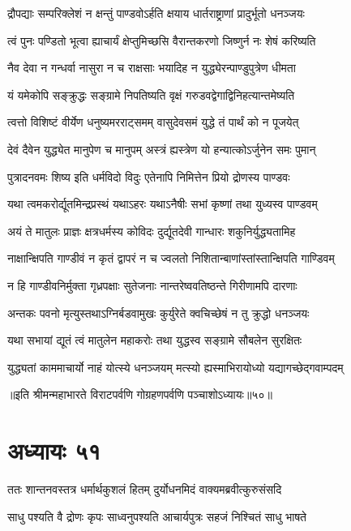 \twolineshloka
{द्रौपद्याः सम्परिक्लेशं न क्षन्तुं पाण्डवोऽर्हति}
{क्षयाय धार्तराष्ट्राणां प्रादुर्भूतो धनञ्जयः}


\twolineshloka
{त्वं पुनः पण्डितो भूत्वा ह्याचार्यं क्षेप्तुमिच्छसि}
{वैरान्तकरणो जिष्णुर्न नः शेषं करिष्यति}


\twolineshloka
{नैव देवा न गन्धर्वा नासुरा न च राक्षसाः}
{भयादिह न युद्ध्येरन्पाण्डुपुत्रेण धीमता}


\twolineshloka
{यं यमेकोपि सङ्क्रुद्धः सङ्ग्रामे निपतिष्यति}
{वृक्षं गरुडवद्वेगाद्विनिहत्यान्तमेष्यति}


\twolineshloka
{त्वत्तो विशिष्टं वीर्येण धनुष्यमरराट्समम्}
{वासुदेवसमं युद्धे तं पार्थं को न पूजयेत्}


\twolineshloka
{देवं दैवेन युद्ध्येत मानुपेण च मानुपम्}
{अस्त्रं ह्यस्त्रेण यो हन्यात्कोऽर्जुनेन समः पुमान्}


\twolineshloka
{पुत्रादनवमः शिष्य इति धर्मविदो विदुः}
{एतेनापि निमित्तेन प्रियो द्रोणस्य पाण्डवः}


\twolineshloka
{यथा त्वमकरोर्द्यूतमिन्द्रप्रस्थं यथाऽहरः}
{यथाऽनैषीः सभां कृष्णां तथा युध्यस्व पाण्डवम्}


\twolineshloka
{अयं ते मातुलः प्राज्ञः क्षत्रधर्मस्य कोविदः}
{दुर्द्यूतदेवी गान्धारः शकुनिर्युद्ध्यतामिह}


\twolineshloka
{नाक्षान्क्षिपति गाण्डीवं न कृतं द्वापरं न च}
{ज्वलतो निशितान्बाणांस्तांस्तान्क्षिपति गाण्डिवम्}


\twolineshloka
{न हि गाण्डीवनिर्मुक्ता गृध्रपक्षाः सुतेजनाः}
{नान्तरेष्ववतिष्ठन्ते गिरीणामपि दारणाः}


\twolineshloka
{अन्तकः पवनो मृत्युस्तथाऽग्निर्बडवामुखः}
{कुर्युरेते क्वचिच्छेषं न तु क्रुद्धो धनञ्जयः}


\twolineshloka
{यथा सभायां द्यूतं त्वं मातुलेन महाकरोः}
{तथा युद्धस्व सङ्ग्रामे सौबलेन सुरक्षितः}


\twolineshloka
{युद्ध्यतां काममाचार्यो नाहं योत्स्ये धनञ्जयम्}
{मत्स्यो ह्यस्माभिरायोध्यो यद्यागच्छेद्गवाम्पदम्}

॥इति श्रीमन्महाभारते विराटपर्वणि गोग्रहणपर्वणि पञ्चाशोऽध्यायः॥५०॥

\chapter{अध्यायः ५१}

\twolineshloka
{ततः शान्तनवस्तत्र धर्मार्थकुशलं हितम्}
{दुर्योधनमिदं वाक्यमब्रवीत्कुरुसंसदि}


\twolineshloka
{साधु पश्यति वै द्रोणः कृपः साध्वनुपश्यति}
{आचार्यपुत्रः सहजं निश्चितं साधु भाषते}


